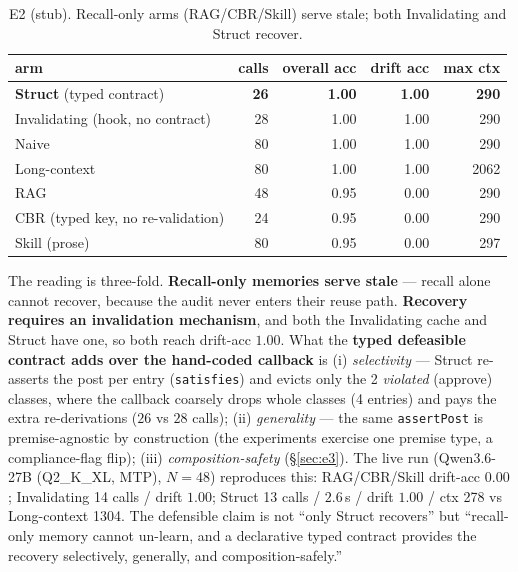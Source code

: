 \documentclass[11pt]{article}
\begin{document}
\begin{table}[h]\centering
\begin{tabular}{lrrrr}
\toprule
arm & calls & overall acc & \textbf{drift acc} & max ctx \\
\midrule
\textbf{Struct} (typed contract) & \textbf{26} & \textbf{1.00} & \textbf{1.00} & \textbf{290} \\
Invalidating (hook, no contract) & 28 & 1.00 & 1.00 & 290 \\
Naive & 80 & 1.00 & 1.00 & 290 \\
Long-context & 80 & 1.00 & 1.00 & 2062 \\
RAG & 48 & 0.95 & 0.00 & 290 \\
CBR (typed key, no re-validation) & 24 & 0.95 & 0.00 & 290 \\
Skill (prose) & 80 & 0.95 & 0.00 & 297 \\
\bottomrule
\end{tabular}
\caption{E2 (stub). Recall-only arms (RAG/CBR/Skill) serve stale; both Invalidating and Struct recover.}
\label{tab:e2}
\end{table}

The reading is three-fold. \textbf{Recall-only memories serve stale} --- recall alone cannot recover,
because the audit never enters their reuse path. \textbf{Recovery requires an invalidation mechanism}, and both the
Invalidating cache and Struct have one, so both reach drift-acc $1.00$. What the \textbf{typed defeasible contract
adds over the hand-coded callback} is (i) \emph{selectivity} --- Struct re-asserts the post per entry
(\texttt{satisfies}) and evicts only the 2 \emph{violated} (approve) classes, where the callback coarsely drops
whole classes (4 entries) and pays the extra re-derivations ($26$ vs $28$ calls); (ii) \emph{generality} --- the
same \texttt{assertPost} is premise-agnostic by construction (the experiments exercise one premise type, a
compliance-flag flip); (iii) \emph{composition-safety} (\S\ref{sec:e3}). The live run
(Qwen3.6-27B (Q2\_K\_XL, MTP), $N{=}48$) reproduces this: RAG/CBR/Skill drift-acc $0.00$; Invalidating 14 calls / drift
$1.00$; Struct 13 calls / $2.6$\,s / drift $1.00$ / ctx 278 vs Long-context 1304. The defensible claim is not ``only
Struct recovers'' but ``recall-only memory cannot un-learn, and a declarative typed contract provides the recovery
selectively, generally, and composition-safely.''
\end{document}
